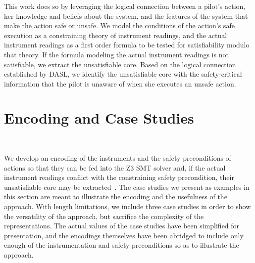 This work does so by leveraging the logical connection between a pilot's action, her knowledge and beliefs about the system, and the features of the system that make the action safe or unsafe. We model the conditions of the action's safe execution as a constraining theory of instrument readings, and the actual instrument readings as a first order formula to be tested for satisfiability modulo that theory. If the formula modeling the actual instrument readings is not satisfiable, we extract the unsatisfiable core. Based on the logical connection established by DASL, we identify the unsatisfiable core with the safety-critical information that the pilot is unaware of when she executes an unsafe action.

\section{Encoding and Case Studies}~\label{encodings}

We develop an encoding of the instruments and the safety preconditions of actions so that they can be fed into the Z3 SMT solver and, if the actual instrument readings conflict with the constraining safety precondition, their unsatisfiable core may be extracted~\cite{z3}. The case studies we present as examples in this section are meant to illustrate the encoding and the usefulness of the approach. With length limitations, we include three case studies in order to show the versatility of the approach, but sacrifice the complexity of the representations. The actual values of the case studies have been simplified for presentation, and the encodings themselves have been abridged to include only enough of the instrumentation and safety preconditions so as to illustrate the approach.

